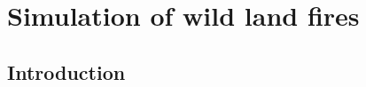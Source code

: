 \documentclass[11pt]{book}
\begin{document}
%
%
%
%
%
%

\clearpage

\chapter{Simulation of wild land fires}

\section{Introduction}
\end{document}
